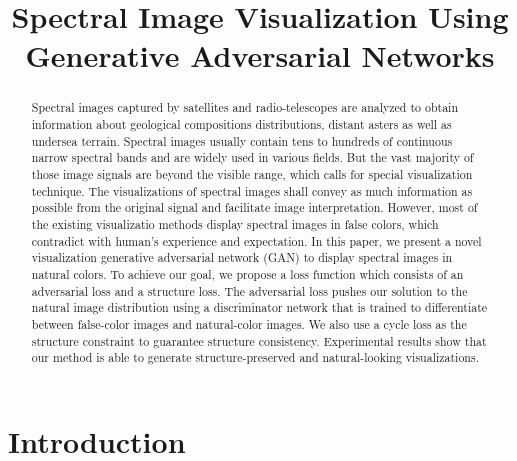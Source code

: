 \documentclass[10pt,conference,a4paper]{IEEEtran}
\begin{document}
\title{Spectral Image Visualization Using Generative Adversarial Networks}


\author{

}










\maketitle

\begin{abstract}
Spectral images captured by satellites and radio-telescopes are analyzed to obtain information about geological compositions distributions, distant asters as well as undersea terrain. Spectral images usually contain tens to hundreds of continuous narrow spectral bands and are widely used in various fields. But the vast majority of those image signals are beyond the visible range, which calls for special visualization technique.
The visualizations of spectral images shall convey as much information as possible from the original signal and facilitate image interpretation.
However, most of the existing visualizatio methods display spectral images in false colors, which contradict with human's experience and expectation.
In this paper, we present a novel visualization generative adversarial network (GAN) to display spectral images in natural colors.
To achieve our goal, we propose a loss function which consists of an adversarial loss and a structure loss.
The adversarial loss pushes our solution to the natural image distribution using a discriminator network
that is trained to differentiate between false-color images and natural-color images.
We also use a cycle loss as the structure constraint to guarantee structure consistency.
Experimental results show that our method is able to generate structure-preserved and natural-looking visualizations.
\end{abstract}





\IEEEpeerreviewmaketitle



\section{Introduction}
\end{document}
